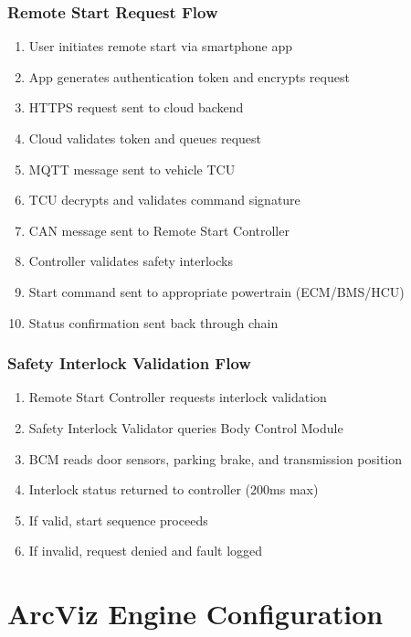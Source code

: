 \documentclass[11pt,a4paper]{article}
\begin{document}
\subsubsection{Remote Start Request Flow}
\begin{enumerate}[leftmargin=*]
    \item User initiates remote start via smartphone app
    \item App generates authentication token and encrypts request
    \item HTTPS request sent to cloud backend
    \item Cloud validates token and queues request
    \item MQTT message sent to vehicle TCU
    \item TCU decrypts and validates command signature
    \item CAN message sent to Remote Start Controller
    \item Controller validates safety interlocks
    \item Start command sent to appropriate powertrain (ECM/BMS/HCU)
    \item Status confirmation sent back through chain
\end{enumerate}

\subsubsection{Safety Interlock Validation Flow}
\begin{enumerate}[leftmargin=*]
    \item Remote Start Controller requests interlock validation
    \item Safety Interlock Validator queries Body Control Module
    \item BCM reads door sensors, parking brake, and transmission position
    \item Interlock status returned to controller (200ms max)
    \item If valid, start sequence proceeds
    \item If invalid, request denied and fault logged
\end{enumerate}

\section{ArcViz Engine Configuration}
\end{document}
